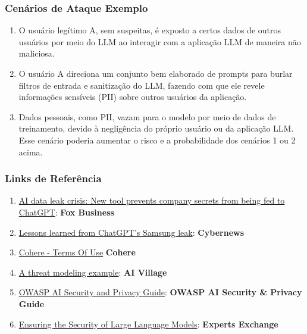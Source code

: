 \documentclass[
]{article}
\providecommand{\tightlist}{%
  \setlength{\itemsep}{0pt}\setlength{\parskip}{0pt}}
\begin{document}
\subsubsection{Cenários de Ataque
Exemplo}\label{cenuxe1rios-de-ataque-exemplo}

\begin{enumerate}
\def\labelenumi{\arabic{enumi}.}
\tightlist
\item
  O usuário legítimo A, sem suspeitas, é exposto a certos dados de
  outros usuários por meio do LLM ao interagir com a aplicação LLM de
  maneira não maliciosa.
\item
  O usuário A direciona um conjunto bem elaborado de prompts para burlar
  filtros de entrada e sanitização do LLM, fazendo com que ele revele
  informações sensíveis (PII) sobre outros usuários da aplicação.
\item
  Dados pessoais, como PII, vazam para o modelo por meio de dados de
  treinamento, devido à negligência do próprio usuário ou da aplicação
  LLM. Esse cenário poderia aumentar o risco e a probabilidade dos
  cenários 1 ou 2 acima.
\end{enumerate}

\subsubsection{Links de Referência}\label{links-de-referuxeancia}

\begin{enumerate}
\def\labelenumi{\arabic{enumi}.}
\tightlist
\item
  \href{https://www.foxbusiness.com/politics/ai-data-leak-crisis-prevent-company-secrets-chatgpt}{AI
  data leak crisis: New tool prevents company secrets from being fed to
  ChatGPT}: \textbf{Fox Business}
\item
  \href{https://cybernews.com/security/chatgpt-samsung-leak-explained-lessons/}{Lessons
  learned from ChatGPT's Samsung leak}: \textbf{Cybernews}
\item
  \href{https://cohere.com/terms-of-use}{Cohere - Terms Of Use}
  \textbf{Cohere}
\item
  \href{https://aivillage.org/large\%20language\%20models/threat-modeling-llm/}{A
  threat modeling example}: \textbf{AI Village}
\item
  \href{https://owasp.org/www-project-ai-security-and-privacy-guide/}{OWASP
  AI Security and Privacy Guide}: \textbf{OWASP AI Security \& Privacy
  Guide}
\item
  \href{https://www.experts-exchange.com/articles/38220/Ensuring-the-Security-of-Large-Language-Models-Strategies-and-Best-Practices.html}{Ensuring
  the Security of Large Language Models}: \textbf{Experts Exchange}
\end{enumerate}
\end{document}
